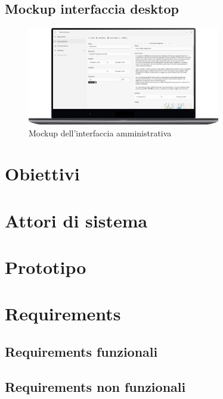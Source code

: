 \documentclass{article}
\begin{document}
\clearpage

\subsection{Mockup interfaccia desktop}
\begin{figure}[htbp]
    \centering
    \includegraphics[width=0.75\textwidth]{Images/Mockup1 - Desktop.png}
    \caption{Mockup dell'interfaccia amministrativa}
\end{figure}
\clearpage

\section{Obiettivi}
\clearpage

\section{Attori di sistema}
\clearpage

\section{Prototipo}
\clearpage

\section{Requirements}
\subsection{Requirements funzionali}
\clearpage

\subsection{Requirements non funzionali}
\clearpage
\end{document}
